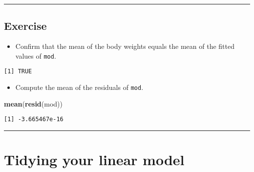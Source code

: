 \documentclass[
]{book}
\newenvironment{Shaded}{\begin{snugshade}}{\end{snugshade}}
\newcommand{\CommentTok}[1]{\textcolor[rgb]{0.56,0.35,0.01}{\textit{#1}}}
\newcommand{\KeywordTok}[1]{\textcolor[rgb]{0.13,0.29,0.53}{\textbf{#1}}}
\newcommand{\NormalTok}[1]{#1}
\newcommand{\OperatorTok}[1]{\textcolor[rgb]{0.81,0.36,0.00}{\textbf{#1}}}
\newcommand{\StringTok}[1]{\textcolor[rgb]{0.31,0.60,0.02}{#1}}
\providecommand{\tightlist}{%
  \setlength{\itemsep}{0pt}\setlength{\parskip}{0pt}}
\begin{document}
\begin{center}\rule{0.5\linewidth}{0.5pt}\end{center}

\hypertarget{exercise-10}{%
\subsection*{Exercise}\label{exercise-10}}

\begin{itemize}
\tightlist
\item
  Confirm that the mean of the body weights equals the mean of the fitted values of \texttt{mod}.
\end{itemize}

\begin{Shaded}
\end{Shaded}

\begin{verbatim}
[1] TRUE
\end{verbatim}

\begin{itemize}
\tightlist
\item
  Compute the mean of the residuals of \texttt{mod}.
\end{itemize}

\begin{Shaded}
\begin{Highlighting}[]
\KeywordTok{mean}\NormalTok{(}\KeywordTok{resid}\NormalTok{(mod))}
\end{Highlighting}
\end{Shaded}

\begin{verbatim}
[1] -3.665467e-16
\end{verbatim}

\begin{center}\rule{0.5\linewidth}{0.5pt}\end{center}

\hypertarget{tidying-your-linear-model}{%
\section{Tidying your linear model}\label{tidying-your-linear-model}}
\end{document}

